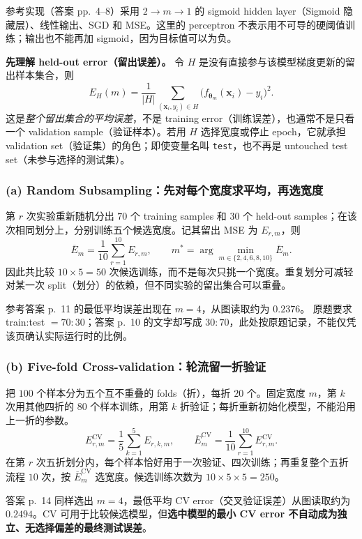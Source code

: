 \begin{workedsolution}
\nopagebreak[4]
参考实现（答案 pp.~4--8）采用 $2\to m\to1$ 的 sigmoid hidden layer（Sigmoid 隐藏层）、线性输出、SGD 和 MSE。这里的 perceptron 不表示用不可导的硬阈值训练；输出也不能再加 sigmoid，因为目标值可以为负。

\textbf{先理解 held-out error（留出误差）。}
令 $H$ 是没有直接参与该模型梯度更新的留出样本集合，则
\[
  E_H(m)=\frac{1}{|H|}\sum_{(\bm x_i,y_i)\in H}
  \bigl(f_{\bm\theta_m}(\bm x_i)-y_i\bigr)^2.
\]
这是\emph{整个留出集合的平均误差}，不是 training error（训练误差），也通常不是只看一个 validation sample（验证样本）。若用 $H$ 选择宽度或停止 epoch，它就承担 validation set（验证集）的角色；即使变量名叫 \texttt{test}，也不再是 untouched test set（未参与选择的测试集）。

\subsubsection*{(a) Random Subsampling：先对每个宽度求平均，再选宽度}

第 $r$ 次实验重新随机分出 $70$ 个 training samples 和 $30$ 个 held-out samples；在该次相同划分上，分别训练五个候选宽度。记其留出 MSE 为 $E_{r,m}$，则
\[
  \overline E_m=\frac{1}{10}\sum_{r=1}^{10}E_{r,m},
  \qquad m^*=\arg\min_{m\in\{2,4,6,8,10\}}\overline E_m.
\]
因此共比较 $10\times5=50$ 次候选训练，而不是每次只挑一个宽度。重复划分可减轻对某一次 split（划分）的依赖，但不同实验的留出集合可以重叠。

参考答案 p.~11 的最低平均误差出现在 $\boxed{m=4}$，从图读取约为 $0.2376$。
原题要求 train:test $=70{:}30$；答案 p.~10 的文字却写成 $30{:}70$，此处按原题记录，不能仅凭该页确认实际运行时的比例。

\subsubsection*{(b) Five-fold Cross-validation：轮流留一折验证}

把 $100$ 个样本分为五个互不重叠的 folds（折），每折 $20$ 个。固定宽度 $m$，第 $k$ 次用其他四折的 $80$ 个样本训练，用第 $k$ 折验证；每折重新初始化模型，不能沿用上一折的参数。
\[
  E^{\mathrm{CV}}_{r,m}=\frac15\sum_{k=1}^{5}E_{r,k,m},
  \qquad
  \overline E^{\mathrm{CV}}_m=\frac1{10}\sum_{r=1}^{10}E^{\mathrm{CV}}_{r,m}.
\]
在第 $r$ 次五折划分内，每个样本恰好用于一次验证、四次训练；再重复整个五折流程 $10$ 次，按 $\overline E^{\mathrm{CV}}_m$ 选宽度。候选训练次数为 $10\times5\times5=250$。

答案 p.~14 同样选出 $\boxed{m=4}$，最低平均 CV error（交叉验证误差）从图读取约为 $0.2494$。CV 可用于比较候选模型，但\textbf{选中模型的最小 CV error 不自动成为独立、无选择偏差的最终测试误差}。


\end{workedsolution}
